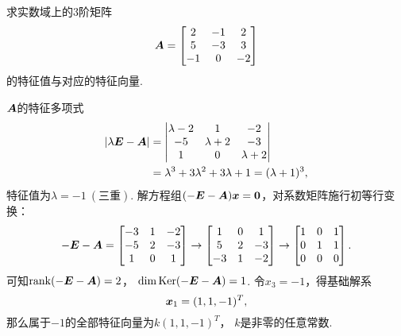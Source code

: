 \begin{example}
求实数域上的3阶矩阵\[
	\boldsymbol{A} = \begin{bmatrix}
		2 & -1 & 2 \\
		5 & -3 & 3 \\
		-1 & 0 & -2
	\end{bmatrix}
\]的特征值与对应的特征向量.
\begin{solution}
\(\boldsymbol{A}\)的特征多项式\begin{align*}
	\abs{\lambda\boldsymbol{E}-\boldsymbol{A}}
	&= \begin{vmatrix}
		\lambda-2 & 1 & -2 \\
		-5 & \lambda+2 & -3 \\
		1 & 0 & \lambda+2
	\end{vmatrix} \\
	&= \lambda^3 + 3\lambda^2 + 3\lambda + 1
	= (\lambda+1)^3,
\end{align*}
特征值为\(\lambda=-1\ (\text{三重})\).
解方程组\((-\boldsymbol{E}-\boldsymbol{A})\boldsymbol{x} = \boldsymbol0\)，对系数矩阵施行初等行变换：\[
	-\boldsymbol{E}-\boldsymbol{A} = \begin{bmatrix}
		-3 & 1 & -2 \\
		-5 & 2 & -3 \\
		1 & 0 & 1
	\end{bmatrix} \to \begin{bmatrix}
		1 & 0 & 1 \\
		5 & 2 & -3 \\
		-3 & 1 & -2
	\end{bmatrix} \to \begin{bmatrix}
		1 & 0 & 1 \\
		0 & 1 & 1 \\
		0 & 0 & 0
	\end{bmatrix}.
\]
可知\(\rank(-\boldsymbol{E}-\boldsymbol{A}) = 2\)，
\(\dim\operatorname{Ker}(-\boldsymbol{E}-\boldsymbol{A}) = 1\).
令\(x_3 = -1\)，得基础解系\[
	\boldsymbol{x}_1 = (1,1,-1)^T,
\]
那么属于\(-1\)的全部特征向量为\(k (1,1,-1)^T\)，
\(k\)是非零的任意常数.
\end{solution}
\end{example}

